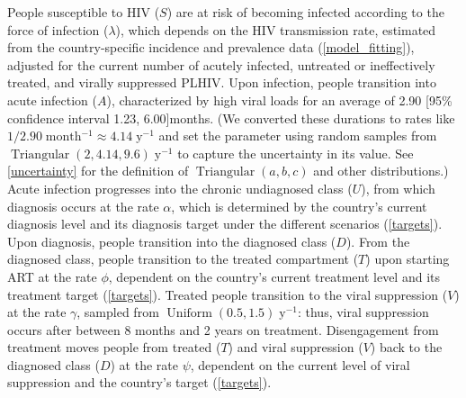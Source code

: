 \documentclass{article}
\DeclareMathOperator{\Uniform}{Uniform}
\DeclareMathOperator{\Triangular}{Triangular}
\begin{document}
People susceptible to HIV ($S$) are at risk of becoming infected
according to the force of infection ($\lambda$), which depends on the
HIV transmission rate, estimated from the country-specific incidence
and prevalence data (\autoref{model_fitting}), adjusted for the
current number of acutely infected, untreated or ineffectively
treated, and virally suppressed PLHIV.  Upon infection, people
transition into acute infection ($A$), characterized by high viral
loads for an average of 2.90 [95\% confidence interval 1.23,
6.00]\;months.\cite{Hollingsworth2008-iy}  (We converted these
durations to rates like $1 / 2.90\;\text{month$^{-1}$} \approx
4.14\;\text{y$^{-1}$}$ and set the parameter using random samples from
$\Triangular(2, 4.14, 9.6)\;\text{y$^{-1}$}$ to capture the
uncertainty in its value.  See \autoref{uncertainty} for the
definition of $\Triangular(a, b, c)$ and other distributions.)  Acute
infection progresses into the chronic undiagnosed class ($U$), from
which diagnosis occurs at the rate $\alpha$, which is determined by
the country's current diagnosis level and its diagnosis target under
the different scenarios (\autoref{targets}).  Upon diagnosis, people
transition into the diagnosed class ($D$).  From the diagnosed class,
people transition to the treated compartment ($T$) upon starting ART
at the rate $\phi$, dependent on the country's current treatment level
and its treatment target (\autoref{targets}).  Treated people
transition to the viral suppression ($V$) at the rate $\gamma$,
sampled from $\Uniform(0.5, 1.5)\;\text{y$^{-1}$}$: thus, viral
suppression occurs after between 8 months and 2 years on
treatment.\cite{Currie2009-yz}  Disengagement from treatment moves
people from treated ($T$) and viral suppression ($V$) back to the
diagnosed class ($D$) at the rate $\psi$, dependent on the current
level of viral suppression and the country's target
(\autoref{targets}).
\end{document}

